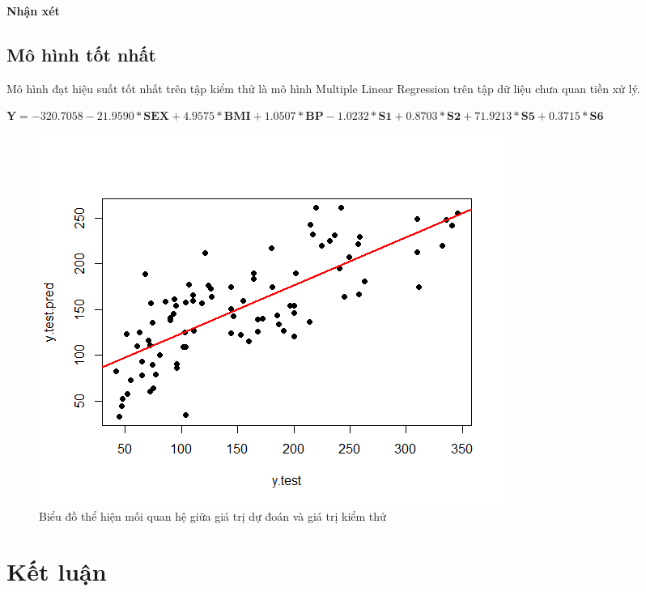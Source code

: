 \documentclass[runningheads]{llncs}
\begin{document}
\textbf{Nhận xét}


\subsection{Mô hình tốt nhất}
Mô hình đạt hiệu suất tốt nhất trên tập kiểm thử là mô hình Multiple Linear Regression trên tập dữ liệu chưa quan tiền xử lý.

\begin{center}
	$\textbf{Y}=  -320.7058 -21.9590* \textbf{SEX} + 4.9575*\textbf{BMI} +  1.0507*\textbf{BP} -
	1.0232*\textbf{S1} + 0.8703*\textbf{S2} + 71.9213*\textbf{S5} + 0.3715*\textbf{S6} $
\end{center}

\begin{figure}[H]
\centering
\includegraphics[width=\textwidth]{Rplot}
\caption{Biểu đồ thể hiện mối quan hệ giữa giá trị dự đoán và giá trị kiểm thử} \label{fig2}
\end{figure}

\section{Kết luận}

\begin{thebibliography}{5}

\end{thebibliography}
\end{document}

